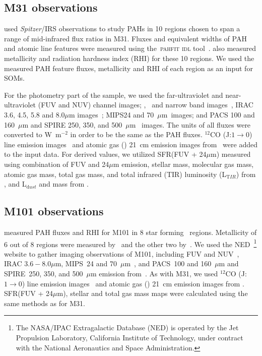     \subsection{M31 observations}
     \label{Sec: data_M31_SOMN} 
     
     \cite{Dim15} used {\it Spitzer}/IRS observations to study PAHs in 10 regions chosen to span a range of mid-infrared flux ratios in M31. 
     Fluxes and equivalent widths of PAH and atomic line features were measured using the~\textsc{pahfit idl} tool~\citep{Smith07b}.
     \cite{Dim15} also measured metallicity and radiation hardness index (RHI) for these 10 regions.
     We used the measured PAH feature fluxes, metallicity and RHI of each region as an input for SOMs.
     
    For the photometry part of the sample, we used the \GALEX \citep{Martin05} far-ultraviolet and near-ultraviolet (FUV and NUV) channel images; \halpha, \sii~and \oiii narrow band images~\citep{Massey07}, IRAC 3.6, 4.5, 5.8 and 8.0$\mu$m images~\citep{Barmby06}; MIPS24 and 70~$\mu$m~images\citep{Gordon06}; and PACS 100 and 160~$\mu$m and SPIRE 250, 350, and 500~$\mu$m~\citep{Fritz12} images.
     The units of all fluxes were converted to W~m$^{-2}$ in order to be the same as the PAH fluxes.
     $^{12}$CO (J:$1\rightarrow0$) line emission images~\citep{Nieten06} and atomic gas (\hi) 21~cm emission images from~\cite{Chemin09} were added to the input data. 
     For derived values, we utilized SFR(FUV + 24$\mu$m) measured using combination of FUV and 24$\mu$m emission, stellar mass, molecular gas mass, atomic gas mass, total gas mass, and total infrared (TIR) luminosity (L$_{\mathrm TIR}$) from \cite{Rahmani16}, and L$_{\mathrm dust}$ and mass from \cite{Draine14}.
     
    \subsection{M101 observations}
    \label{Sec: data_M101_SOMN} 
    
     \cite{Gordon08} measured PAH fluxes and RHI for M101 in 8 star forming \hii~regions.
     Metallicity of 6 out of 8 regions were measured by~\cite{Kennicutt03} and the other two by~\cite{Gordon08}.
     We used the NED~\footnote{The NASA/IPAC Extragalactic Database (NED) is operated by the Jet Propulsion Laboratory, California Institute of Technology, under contract with the National Aeronautics and Space Administration.} website to gather imaging observations of M101, including 
      \GALEX FUV and NUV~\citep{depaz07}, IRAC $3.6-8.0\mu$m, MIPS~24 and 70~$\mu$m~\citep{Dale09}, and PACS~100 and 160~$\mu$m and SPIRE~250, 350, and 500~$\mu$m emission from~\cite{Kennicutt11}.
     As with M31, we used $^{12}$CO (J:$1\rightarrow0$) line emission images~\citep{Helfer03} and atomic gas (\hi) 21~cm emission images from \cite{Walter08}.
     SFR(FUV + 24$\mu$m), stellar and total gas mass maps were calculated using the same methods as for M31.
     
